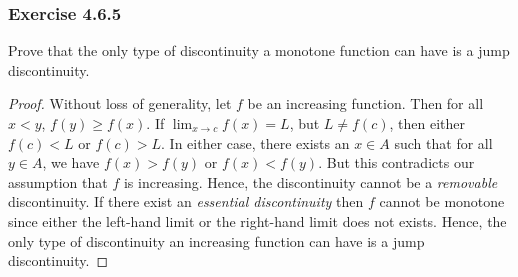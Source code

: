 \subsubsection{Exercise 4.6.5} Prove that the only type of discontinuity a monotone function can have is a jump discontinuity.
\begin{proof}
Without loss of generality, let \( f  \) be an increasing function. Then for all \( x < y  \), \( f(y) \geq f(x)  \). If \( \lim_{ x \to c  } f(x) = L  \), but \( L \neq f(c) \), then either \( f(c) < L  \) or \( f(c) > L \). In either case, there exists an \( x \in A  \) such that for all \( y \in A  \), we have \( f(x) > f(y)  \) or \( f(x) < f(y)  \). But this contradicts our assumption that \( f  \) is increasing. Hence, the discontinuity cannot be a \textit{removable} discontinuity. If there exist an \textit{essential discontinuity} then \( f  \) cannot be monotone since either the left-hand limit or the right-hand limit does not exists. Hence, the only type of discontinuity an increasing function can have is a jump discontinuity.
\end{proof}

